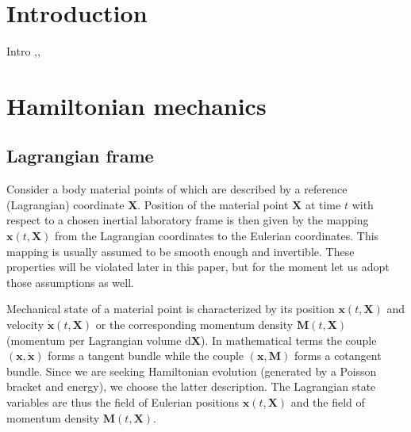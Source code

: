\documentclass[
10pt, %
a4paper, %
oneside, %
headinclude,footinclude, %
BCOR5mm, %
]{scrartcl}
\newcommand{\xx}{\mathbf{x}}
\newcommand{\XX}{\mathbf{X}}
\newcommand{\diff}{\mathrm{d}}
\newcommand{\MM}{\mathbf{M}}
\begin{document}

\let\thefootnote\relax{}

\let\thefootnote\relax{}
\let\thefootnote\relax{}
\let\thefootnote\relax{}


\newpage %


\section{Introduction}

Intro 
\cite{HCO},\cite{PKG}, \cite{Markus2009}

\section{Hamiltonian mechanics}
\subsection{Lagrangian frame}
Consider a body material points of which are described by a reference (Lagrangian) coordinate $\XX$. Position of the material point $\XX$ at time $t$ with respect to a chosen inertial laboratory frame is then given by the mapping $\xx(t,\XX)$ from the Lagrangian coordinates to the Eulerian coordinates. This mapping is usually assumed to be smooth enough and invertible. These properties will be violated later in this paper, but for the moment let us adopt those assumptions as well. 

Mechanical state of a material point is characterized by its position $\xx(t,\XX)$ and velocity $\dot{\xx}(t,\XX)$ or the corresponding momentum density $\MM(t,\XX)$ (momentum per Lagrangian volume $\diff \XX$). In mathematical terms the couple $(\xx,\dot{\xx})$ forms a tangent bundle while the couple $(\xx,\MM)$ forms a cotangent bundle. Since we are seeking Hamiltonian evolution (generated by a Poisson bracket and energy), we choose the latter description. The Lagrangian state variables are thus the field of Eulerian positions $\xx(t,\XX)$ and the field of momentum density $\MM(t,\XX)$. 
\end{document}
